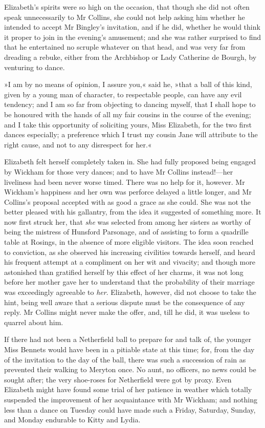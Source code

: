 Elizabeth's spirits were so high on the occasion, that though she did not often speak unnecessarily to Mr Collins, she could not help asking him whether he intended to accept Mr Bingley's invitation, and if he did, whether he would think it proper to join in the evening's amusement; and she was rather surprised to find that he entertained no scruple whatever on that head, and was very far from dreading a rebuke, either from the Archbishop or Lady Catherine de Bourgh, by venturing to dance.

»I am by no means of opinion, I assure you,« said he, »that a ball of this kind, given by a young man of character, to respectable people, can have any evil tendency; and I am so far from objecting to dancing myself, that I shall hope to be honoured with the hands of all my fair cousins in the course of the evening; and I take this opportunity of soliciting yours, Miss Elizabeth, for the two first dances especially; a preference which I trust my cousin Jane will attribute to the right cause, and not to any disrespect for her.«

Elizabeth felt herself completely taken in. She had fully proposed being engaged by Wickham for those very dances; and to have Mr Collins instead!—her liveliness had been never worse timed. There was no help for it, however. Mr Wickham's happiness and her own was perforce delayed a little longer, and Mr Collins's proposal accepted with as good a grace as she could. She was not the better pleased with his gallantry, from the idea it suggested of something more. It now first struck her, that \textit{she} was selected from among her sisters as worthy of being the mistress of Hunsford Parsonage, and of assisting to form a quadrille table at Rosings, in the absence of more eligible visitors. The idea soon reached to conviction, as she observed his increasing civilities towards herself, and heard his frequent attempt at a compliment on her wit and vivacity; and though more astonished than gratified herself by this effect of her charms, it was not long before her mother gave her to understand that the probability of their marriage was exceedingly agreeable to \textit{her}. Elizabeth, however, did not choose to take the hint, being well aware that a serious dispute must be the consequence of any reply. Mr Collins might never make the offer, and, till he did, it was useless to quarrel about him.

If there had not been a Netherfield ball to prepare for and talk of, the younger Miss Bennets would have been in a pitiable state at this time; for, from the day of the invitation to the day of the ball, there was such a succession of rain as prevented their walking to Meryton once. No aunt, no officers, no news could be sought after; the very shoe-roses for Netherfield were got by proxy. Even Elizabeth might have found some trial of her patience in weather which totally suspended the improvement of her acquaintance with Mr Wickham; and nothing less than a dance on Tuesday could have made such a Friday, Saturday, Sunday, and Monday endurable to Kitty and Lydia.